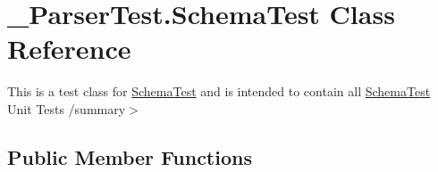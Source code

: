 \hypertarget{class__1920_parser_test_1_1_schema_test}{}\section{\+\_\+Parser\+Test.\+Schema\+Test Class Reference}
\label{class__1920_parser_test_1_1_schema_test}


This is a test class for \hyperlink{class__1920_parser_test_1_1_schema_test}{Schema\+Test} and is intended to contain all \hyperlink{class__1920_parser_test_1_1_schema_test}{Schema\+Test} Unit Tests /summary$>$  


\subsection*{Public Member Functions}
